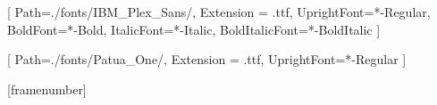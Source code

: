 \usepackage[]{units}
\usepackage{listings}
\usepackage{multicol}
\usepackage{tcolorbox}
\usepackage{physics}


  
\setmainfont{IBMPlexSans}[
  Path=./fonts/IBM_Plex_Sans/,
  Extension = .ttf,
  UprightFont=*-Regular,
  BoldFont=*-Bold,
  ItalicFont=*-Italic,
  BoldItalicFont=*-BoldItalic
  ]

\setsansfont{PatuaOne}[
  Path=./fonts/Patua_One/,
  Extension = .ttf,
  UprightFont=*-Regular
  ]
  
[framenumber]

\beamertemplatenavigationsymbolsempty
